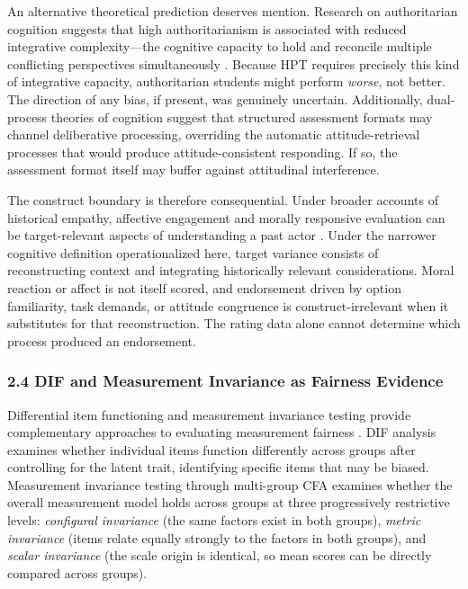 \documentclass[
  12pt,
]{article}
\newcommand{\Loc}[1]{\linelabel{loc:#1}}
\newcommand{\LocEnd}[1]{\linelabel{loc:#1:end}}
\begin{document}
An alternative theoretical prediction deserves mention. Research on authoritarian cognition suggests that high authoritarianism is associated with reduced integrative complexity---the cognitive capacity to hold and reconcile multiple conflicting perspectives simultaneously \citep{Duckitt2001,Suedfeld1977}. Because HPT requires precisely this kind of integrative capacity, authoritarian students might perform \emph{worse}, not better. The direction of any bias, if present, was genuinely uncertain. Additionally, dual-process theories of cognition \citep{Evans2013} suggest that structured assessment formats may channel deliberative processing, overriding the automatic attitude-retrieval processes that would produce attitude-consistent responding. If so, the assessment format itself may buffer against attitudinal interference.

\Loc{s23-boundary}The construct boundary is therefore consequential. Under broader accounts of
historical empathy, affective engagement and morally responsive evaluation can
be target-relevant aspects of understanding a past actor
\citep{Barton_Levstik2004Teaching,Endacott_Brooks2013An_Updated}. Under the narrower cognitive
definition operationalized here, target variance consists of reconstructing
context and integrating historically relevant considerations. Moral reaction
or affect is not itself scored, and endorsement driven by option familiarity,
task demands, or attitude congruence is construct-irrelevant when it substitutes
for that reconstruction. The rating data alone cannot determine which process
produced an endorsement.\LocEnd{s23-boundary}

\hypertarget{dif-and-measurement-invariance-as-fairness-evidence}{%
\subsubsection{2.4 DIF and Measurement Invariance as Fairness Evidence}\label{dif-and-measurement-invariance-as-fairness-evidence}}

Differential item functioning and measurement invariance testing provide complementary approaches to evaluating measurement fairness \citep{Chen2007,Cheung2002,Finch2005}. DIF analysis examines whether individual items function differently across groups after controlling for the latent trait, identifying specific items that may be biased. Measurement invariance testing through multi-group CFA examines whether the overall measurement model holds across groups at three progressively restrictive levels: \emph{configural invariance} (the same factors exist in both groups), \emph{metric invariance} (items relate equally strongly to the factors in both groups), and \emph{scalar invariance} (the scale origin is identical, so mean scores can be directly compared across groups).
\end{document}
